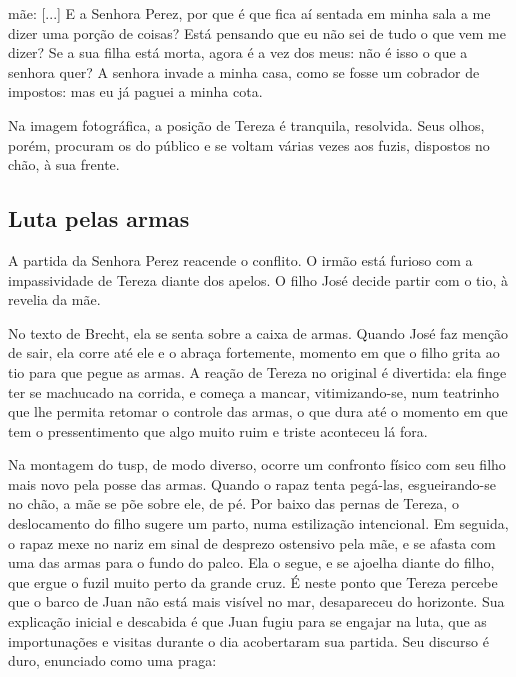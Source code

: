 {\sc mãe}: {[}...{]} E a Senhora Perez, por que é que fica aí sentada em
minha sala a me dizer uma porção de coisas? Está pensando que eu não sei
de tudo o que vem me dizer? Se a sua filha está morta, agora é a vez dos
meus: não é isso o que a senhora quer? A senhora invade a minha casa,
como se fosse um cobrador de impostos: mas eu já paguei a minha cota.

Na imagem fotográfica, a posição de Tereza é tranquila, resolvida. Seus
olhos, porém, procuram os do público e se voltam várias vezes aos fuzis,
dispostos no chão, à sua frente.


\subsection{Luta pelas armas}

A partida da Senhora Perez reacende o conflito. O irmão está furioso com
a impassividade de Tereza diante dos apelos. O filho José decide partir
com o tio, à revelia da mãe.

No texto de Brecht, ela se senta sobre a caixa de armas. Quando José faz
menção de sair, ela corre até ele e o abraça fortemente, momento em que
o filho grita ao tio para que pegue as armas. A reação de Tereza no
original é divertida: ela finge ter se machucado na corrida, e começa a
mancar, vitimizando-se, num teatrinho que lhe permita retomar o controle
das armas, o que dura até o momento em que tem o pressentimento que algo
muito ruim e triste aconteceu lá fora.

Na montagem do {\sc tusp}, de modo diverso, ocorre um confronto físico com seu
filho mais novo pela posse das armas. Quando o rapaz tenta pegá-las,
esgueirando-se no chão, a mãe se põe sobre ele, de pé. Por baixo das
pernas de Tereza, o deslocamento do filho sugere um parto, numa
estilização intencional. Em seguida, o rapaz mexe no nariz em sinal de
desprezo ostensivo pela mãe, e se afasta com uma das armas para o fundo
do palco. Ela o segue, e se ajoelha diante do filho, que ergue o fuzil
muito perto da grande cruz. É neste ponto que Tereza percebe que o barco
de Juan não está mais visível no mar, desapareceu do horizonte. Sua
explicação inicial e descabida é que Juan fugiu para se engajar na luta,
que as importunações e visitas durante o dia acobertaram sua partida.
Seu discurso é duro, enunciado como uma praga:

